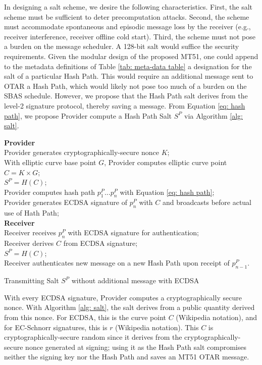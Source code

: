 \documentclass[letterpaper,times]{IONconf/IONconf}
\begin{document}
In designing a salt scheme, we desire the following characteristics.
First, the salt scheme must be sufficient to deter precomputation attacks.
Second, the scheme must accommodate spontaneous and episodic message loss by the receiver (e.g., receiver interference, receiver offline cold start).
Third, the scheme must not pose a burden on the message scheduler.
A 128-bit salt would suffice the security requirements.
Given the modular design of the proposed MT51, one could append to the metadata definitions of Table \ref{tab: meta-data table} a designation for the salt of a particular Hash Path.
This would require an additional message sent to OTAR a Hash Path, which would likely not pose too much of a burden on the SBAS schedule.
However, we propose that the Hash Path salt derives from the level-2 signature protocol, thereby saving a message.
From Equation \eqref{eq: hash path}, we propose Provider compute a Hash Path Salt $S^P$ via Algorithm \ref{alg: salt}.

\begin{algorithm}[H] \label{alg: salt}
\SetAlgoLined
{\bf Provider} \\
Provider generates cryptographically-secure nonce $K$;\\
With elliptic curve base point $G$, Provider computes elliptic curve point $C = K \times G$; \\
$S^P = H(C)$; \\
Provider computes hash path $p^P_1 ... p^P_n$ with Equation \eqref{eq: hash path}; \\
Provider generates ECDSA signature of $p^P_n$ with $C$ and broadcasts before actual use of Hath Path; \\
{\bf Receiver} \\
Receiver receives $p^P_n$ with ECDSA signature for authentication; \\
Receiver derives $C$ from ECDSA signature; \\
$S^P = H(C)$; \\
Receiver authenticates new message on a new Hash Path upon receipt of $p^P_{n-1}$.
\caption{Transmitting Salt $S^P$ without additional message with ECDSA}
\end{algorithm}

With every ECDSA signature, Provider computes a cryptographically secure nonce.
With Algorithm \ref{alg: salt}, the salt derives from a public quantity derived from this nonce.
For ECDSA, this is the curve point $C$ (Wikipedia notation), and for EC-Schnorr signatures, this is $r$ (Wikipedia notation).
This $C$ is cryptographically-secure random since it derives from the cryptographically-secure nonce generated at signing; using it as the Hash Path salt compromises neither the signing key nor the Hash Path  and saves an MT51 OTAR message.
\end{document}
